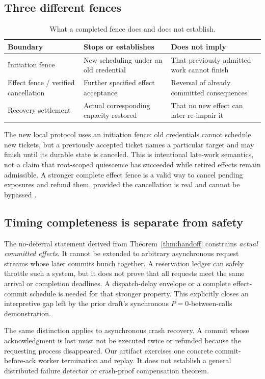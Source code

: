 \subsection{Three different fences}
\begin{table}[ht]
\centering\small
\caption{What a completed fence does and does not establish.}
\begin{tabularx}{\linewidth}{@{}lXX@{}}\toprule
Boundary & Stops or establishes & Does not imply\\\midrule
Initiation fence & New scheduling under an old credential & That previously admitted work cannot finish\\
Effect fence / verified cancellation & Further specified effect acceptance & Reversal of already committed consequences\\
Recovery settlement & Actual corresponding capacity restored & That no new effect can later re-impair it\\\bottomrule
\end{tabularx}
\end{table}
The new local protocol uses an initiation fence: old credentials cannot schedule new tickets, but a previously accepted ticket names a particular target and may finish until its durable state is canceled. This is intentional late-work semantics, not a claim that root-scoped quiescence has succeeded while retired effects remain admissible. A stronger complete effect fence is a valid way to cancel pending exposures and refund them, provided the cancellation is real and cannot be bypassed \cite{quiescence}.

\subsection{Timing completeness is separate from safety}
The no-deferral statement derived from Theorem~\ref{thm:handoff} constrains \emph{actual committed effects}. It cannot be extended to arbitrary asynchronous request streams whose later commits bunch together. A reservation ledger can safely throttle such a system, but it does not prove that all requests meet the same arrival or completion deadlines. A dispatch-delay envelope or a complete effect-commit schedule is needed for that stronger property. This explicitly closes an interpretive gap left by the prior draft's synchronous $P=0$-between-calls demonstration.

The same distinction applies to asynchronous crash recovery. A commit whose acknowledgment is lost must not be executed twice or refunded because the requesting process disappeared. Our artifact exercises one concrete commit-before-ack worker termination and replay. It does not establish a general distributed failure detector or crash-proof compensation theorem.


